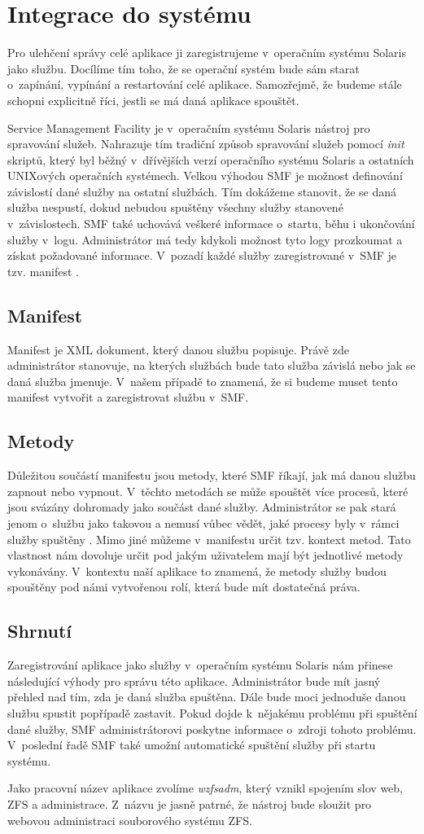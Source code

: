\section{Integrace do systému}
Pro ulehčení správy celé aplikace ji zaregistrujeme v~operačním systému Solaris jako službu. Docílíme tím toho, že se operační systém bude sám starat o~zapínání, vypínání a restartování celé aplikace. Samozřejmě, že budeme stále schopni explicitně říci, jestli se má daná aplikace spouštět.

Service Management Facility je v~operačním systému Solaris nástroj pro spravování služeb. Nahrazuje tím tradiční způsob spravování služeb pomocí \emph{init} skriptů, který byl běžný v~dřívějších verzí operačního systému Solaris a ostatních UNIXových operačních systémech. Velkou výhodou SMF je možnost definování závislostí dané služby na ostatní službách. Tím dokážeme stanovit, že se daná služba nespustí, dokud nebudou spuštěny všechny služby stanovené v~závislostech. SMF také uchovává veškeré informace o~startu, běhu i ukončování služby v~logu. Administrátor má tedy kdykoli možnost tyto logy prozkoumat a získat požadované informace. V~pozadí každé služby zaregistrované v~SMF je tzv. manifest \cite{SMF}.
    \subsection{Manifest}
    Manifest je XML dokument, který danou službu popisuje. Právě zde administrátor stanovuje, na kterých službách bude tato služba závislá nebo jak se daná služba jmenuje. V~našem případě to znamená, že si budeme muset tento manifest vytvořit a zaregistrovat službu v~SMF.
    \subsection{Metody}
    Důležitou součástí manifestu jsou metody, které SMF říkají, jak má danou službu zapnout nebo vypnout. V~těchto metodách se může spouštět více procesů, které jsou svázány dohromady jako součást dané služby. Administrátor se pak stará jenom o~službu jako takovou a nemusí vůbec vědět, jaké procesy byly v~rámci služby spuštěny \cite{SMF}. Mimo jiné můžeme v~manifestu určit tzv. kontext metod. Tato vlastnost nám dovoluje určit pod jakým uživatelem mají být jednotlivé metody vykonávány. V~kontextu naší aplikace to znamená, že metody služby budou spouštěny pod námi vytvořenou rolí, která bude mít dostatečná práva.
    \subsection{Shrnutí}
    Zaregistrování aplikace jako služby v~operačním systému Solaris nám přinese následující výhody pro správu této aplikace. Administrátor bude mít jasný přehled nad tím, zda je daná služba spuštěna. Dále bude moci jednoduše danou službu spustit popřípadě zastavit. Pokud dojde k~nějakému problému při spuštění dané služby, SMF administrátorovi poskytne informace o~zdroji tohoto problému. V~poslední řadě SMF také umožní automatické spuštění služby při startu systému.

    Jako pracovní název aplikace zvolíme \emph{wzfsadm}, který vznikl spojením slov web, ZFS a administrace. Z~názvu je jasně patrné, že nástroj bude sloužit pro webovou administraci souborového systému ZFS.


